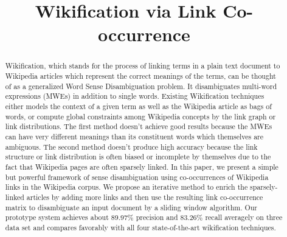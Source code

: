 \documentclass{sig-alternate}%
\begin{document}
\title{Wikification via Link Co-occurrence}
%
\maketitle

\begin{abstract}
Wikification, which stands for the process of linking terms in a
plain text document to Wikipedia articles which represent the correct
meanings of the terms, can be thought
of as a generalized Word Sense Disambiguation problem.
It disambiguates multi-word expressions (MWEs) in addition to single words.
Existing Wikification techniques either models the context of a given
term as well as the Wikipedia article as bags of words, or compute
global constraints among Wikipedia concepts by the link graph or
link distributions. The first method doesn't achieve good results
because the MWEs can have very different meanings than its constituent
words which themselves are ambiguous. The second method doesn't produce
high accuracy because the link structure or link distribution is often
biased or incomplete by themselves due to the fact that Wikipedia pages
are often sparsely linked.
In this paper, we present a simple but powerful framework
of sense disambiguation
using co-occurrences of Wikipedia links in the Wikipedia
corpus. We propose an iterative method to enrich the sparsely-linked
articles by adding more links and then use the resulting
link co-occurrence matrix to disambiguate an input document by a sliding
window algorithm.  Our prototype system achieves about 89.97\% precision
and 83.26\% recall averagely on three data set and compares favorably
with all four state-of-the-art wikification techniques.
\end{abstract}
\end{document}
